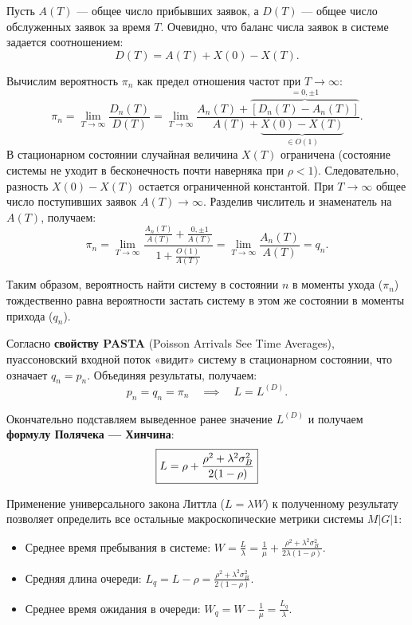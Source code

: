 \begin{tproof}
Пусть $A(T)$ — общее число прибывших заявок, а $D(T)$ — общее число обслуженных заявок за время $T$. Очевидно, что баланс числа заявок в системе задается соотношением:
\begin{equation}\label{eq:balance_total}
    D(T) = A(T) + X(0) - X(T).
\end{equation}

Вычислим вероятность $\pi_n$ как предел отношения частот при $T \to \infty$:
\begin{equation}\label{eq:limit_derivation}
    \pi_n = \lim_{T \to \infty} \frac{D_n(T)}{D(T)} = \lim_{T \to \infty} \frac{A_n(T) + \overbrace{[D_n(T) - A_n(T)]}^{= 0, \pm 1}}{A(T) + \underbrace{X(0) - X(T)}_{\in O(1)}}.
\end{equation}
В стационарном состоянии случайная величина $X(T)$ ограничена (состояние системы не уходит в бесконечность почти наверняка при $\rho < 1$). Следовательно, разность $X(0) - X(T)$ остается ограниченной константой. При $T \to \infty$ общее число поступивших заявок $A(T) \to \infty$. Разделив числитель и знаменатель на $A(T)$, получаем:
\begin{equation*}
    \pi_n = \lim_{T \to \infty} \frac{\frac{A_n(T)}{A(T)} + \frac{0, \pm 1}{A(T)}}{1 + \frac{O(1)}{A(T)}} = \lim_{T \to \infty} \frac{A_n(T)}{A(T)} = q_n.
\end{equation*}

Таким образом, вероятность найти систему в состоянии $n$ в моменты ухода ($\pi_n$) тождественно равна вероятности застать систему в этом же состоянии в моменты прихода ($q_n$). 

Согласно \textbf{свойству PASTA} (Poisson Arrivals See Time Averages), пуассоновский входной поток «видит» систему в стационарном состоянии, что означает $q_n = p_n$. Объединяя результаты, получаем:
\begin{equation*}
    p_n = q_n = \pi_n \quad \implies \quad L = L^{(D)}.
\end{equation*}

Окончательно подставляем выведенное ранее значение $L^{(D)}$ и получаем \textbf{формулу Полячека — Хинчина}:
\begin{equation*}
    \fbox{$\displaystyle L = \rho + \frac{\rho^2 + \lambda^2 \sigma_B^2}{2 (1 - \rho)}$}
\end{equation*}
\end{tproof}

\begin{conseq}
Применение универсального закона Литтла ($L = \lambda W$) к полученному результату позволяет определить все остальные макроскопические метрики системы $M|G|1$:
\begin{itemize}
    \item Среднее время пребывания в системе: $\displaystyle W = \frac{L}{\lambda} = \frac{1}{\mu} + \frac{\rho^2 + \lambda^2 \sigma_B^2}{2\lambda(1-\rho)}$.
    \item Средняя длина очереди: $\displaystyle L_q = L - \rho = \frac{\rho^2 + \lambda^2 \sigma_B^2}{2(1-\rho)}$.
    \item Среднее время ожидания в очереди: $\displaystyle W_q = W - \frac{1}{\mu} = \frac{L_q}{\lambda}$.
\end{itemize}
\end{conseq}

